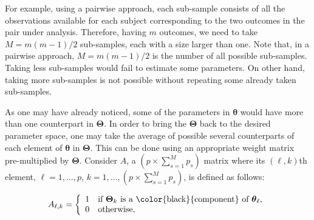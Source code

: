\documentclass[11pt,a5paper,twoside]{book}
\begin{document}
For example, using a pairwise approach, each sub-sample consists of all the observations available for each subject corresponding to the two outcomes in the pair under analysis. Therefore, having $m$ outcomes, we need to take $M=m(m-1)/2$ sub-samples, each with a size larger than one. Note that, in a pairwise approach, $M=m(m-1)/2$ is the number of all possible sub-samples. Taking less sub-samples would fail to estimate some parameters. On other hand, taking more sub-samples is not possible without repeating some already taken sub-samples.  {}





As one may have already noticed, some of the parameters in $\boldsymbol{\theta}$ would have more than one counterpart in $\boldsymbol{\Theta}$. In order to bring the $\boldsymbol{\Theta}$ back to the desired parameter space, one may take the average of possible several counterparts of each element of $\boldsymbol{\theta}$ in $\boldsymbol{\Theta}$. This can be done using an appropriate weight matrix pre-multiplied by $\boldsymbol{\Theta}$. Consider $A$, a $(p\times \sum_{s=1}^M p_s)$ matrix where its $(\ell,k)$th element, $\ell=1,\ldots,p$, $k=1,\ldots, (p\times \sum_{s=1}^M p_s)$, is defined as follows:


\begin{equation}
\label{matrix_A}
A_{\ell,k} = \left\{
\begin{array}{rl}
1 & \text{if } \boldsymbol{\Theta}_{k} \text{ is a {\color{black}{component}} of } \boldsymbol{\theta}_{\ell},\\
0 & \text{otherwise},
\end{array} \right.
\end{equation}
\end{document}
